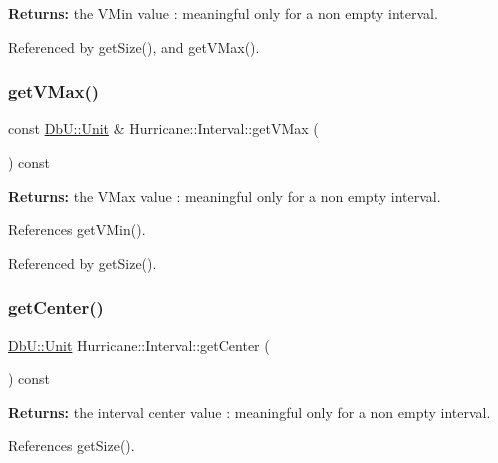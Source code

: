 {\bfseries Returns\+:} the V\+Min value \+: meaningful only for a non empty interval. 

Referenced by get\+Size(), and get\+V\+Max().

\mbox{\label{classHurricane_1_1Interval_a2f5ec659fde913492f89dc215001acb2}} 
\subsubsection{\texorpdfstring{get\+V\+Max()}{getVMax()}}
{\footnotesize\ttfamily const \hyperlink{group__DbUGroup_ga4fbfa3e8c89347af76c9628ea06c4146}{Db\+U\+::\+Unit} \& Hurricane\+::\+Interval\+::get\+V\+Max (\begin{DoxyParamCaption}{ }\end{DoxyParamCaption}) const\hspace{0.3cm}{\ttfamily [inline]}}

{\bfseries Returns\+:} the V\+Max value \+: meaningful only for a non empty interval. 

References get\+V\+Min().



Referenced by get\+Size().

\mbox{\label{classHurricane_1_1Interval_a6d12d0404054c7ccadab1afa6683a561}} 
\subsubsection{\texorpdfstring{get\+Center()}{getCenter()}}
{\footnotesize\ttfamily \hyperlink{group__DbUGroup_ga4fbfa3e8c89347af76c9628ea06c4146}{Db\+U\+::\+Unit} Hurricane\+::\+Interval\+::get\+Center (\begin{DoxyParamCaption}{ }\end{DoxyParamCaption}) const\hspace{0.3cm}{\ttfamily [inline]}}

{\bfseries Returns\+:} the interval center value \+: meaningful only for a non empty interval. 

References get\+Size().

